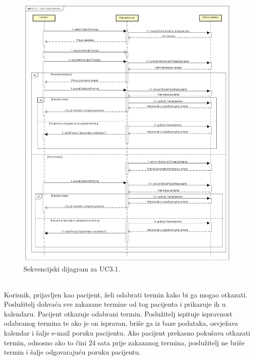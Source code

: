 \begin{figure}[H]
	\includegraphics[scale=0.45]{slike/UC3.1_Zakazivanje_termina}
	\centering
	\caption{Sekvencijski dijagram za UC3.1.}
\end{figure}

\newpage

\textbf{}\\

Korisnik, prijavljen kao pacijent, želi odabrati termin kako bi ga mogao otkazati. Poslužitelj dohvaća sve zakazane termine od tog pacijenta i prikazuje ih u kalendaru. Pacijent otkazuje odabrani termin. Poslužitelj ispituje ispravnost odabranog termina te ako je on ispravan, briše ga iz baze podataka, osvježava kalendar i šalje e-mail poruku pacijentu. Ako pacijent prekasno pokušava otkazati termin, odnosno ako to čini 24 sata prije zakazanog termina, poslužitelj ne briše termin i šalje odgovarajuću poruku pacijentu.

